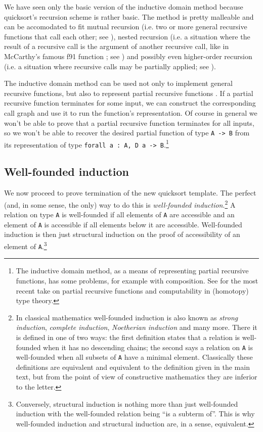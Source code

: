 \documentclass[declaration,mgr,english,shortabstract]{iithesis}
\newcommand{\m}[1]{\texttt{#1}}
\begin{document}
We have seen only the basic version of the inductive domain method because quicksort's recursion scheme is rather basic. The method is pretty malleable and can be accomodated to fit mutual recursion (i.e. two or more general recursive functions that call each other; see \cite{BCM3}), nested recursion (i.e. a situation where the result of a recursive call is the argument of another recursive call, like in McCarthy's famous f91 function \cite{f91}; see \cite{BCM2}) and possibly even higher-order recursion (i.e. a situation where recursive calls may be partially applied; see \cite{BCM6}).

The inductive domain method can be used not only to implement general recursive functions, but also to represent partial recursive functions \cite{BCM8}. If a partial recursive function terminates for some input, we can construct the corresponding call graph and use it to run the function's representation. Of course in general we won't be able to prove that a partial recursive function terminates for all inputs, so we won't be able to recover the desired partial function of type \m{A -> B} from its representation of type \m{forall a\ :\ A, D a -> B}.\footnote{The inductive domain method, as a means of representing partial recursive functions, has some problems, for example with composition. See \cite{Knapp} for the most recent take on partial recursive functions and computability in (homotopy) type theory.}

\subsection{Well-founded induction}

We now proceed to prove termination of the new quicksort template. The perfect (and, in some sense, the only) way to do this is \textit{well-founded induction}.\footnote{In classical mathematics well-founded induction is also known as \textit{strong induction}, \textit{complete induction}, \textit{Noetherian induction} and many more. There it is defined in one of two ways: the first definition states that a relation is well-founded when it has no descending chains; the second says a relation on \m{A} is well-founded when all subsets of \m{A} have a minimal element. Classically these definitions are equivalent and equivalent to the definition given in the main text, but from the point of view of constructive mathematics they are inferior to the letter.} A relation on type \m{A} is well-founded if all elements of \m{A} are accessible and an element of \m{A} is accessible if all elements below it are accessible. Well-founded induction is then just structural induction on the proof of accessibility of an element of \m{A}.\footnote{Conversely, structural induction is nothing more than just well-founded induction with the well-founded relation being ``is a subterm of''. This is why well-founded induction and structural induction are, in a sense, equivalent.}
\end{document}
